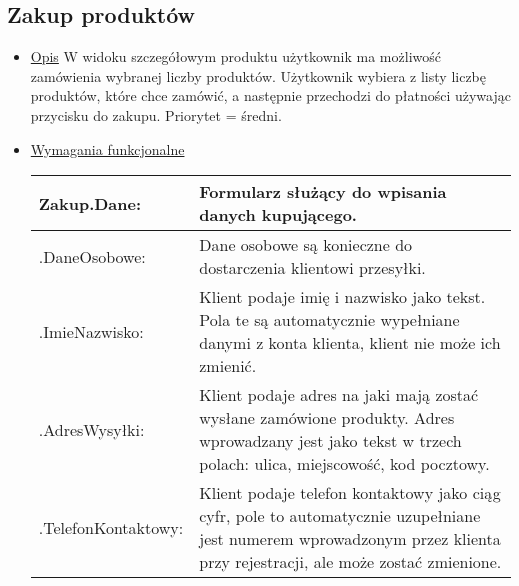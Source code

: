 \documentclass[a4paper,20pt]{article}
\begin{document}
\subsection{Zakup produktów}

\begin{itemize}
\item \underline{Opis} 
\newline
\newline
W widoku szczegółowym produktu użytkownik ma możliwość zamówienia wybranej liczby produktów. Użytkownik wybiera z listy liczbę produktów, które chce zamówić, a następnie przechodzi do płatności używając przycisku do zakupu. Priorytet = średni.
\newline

\item \underline{Wymagania funkcjonalne}

\begin{center}
\begin{tabularx}{\textwidth}[t]{XX}


\arrayrulecolor{black}\hline
\textbf{Zakup.Dane:} & \textbf{Formularz służący do wpisania danych kupującego.} \\

\hline

\quad .DaneOsobowe: & 
\begin{minipage}[t]{\linewidth}%
Dane osobowe są konieczne do dostarczenia klientowi przesyłki.    
\end{minipage}\\

\quad \quad .ImieNazwisko: & 
\begin{minipage}[t]{\linewidth}%
Klient podaje imię i nazwisko jako tekst. Pola te są automatycznie wypełniane danymi z konta klienta, klient nie może ich zmienić.    
\end{minipage}\\

\quad \quad .AdresWysyłki: & 
\begin{minipage}[t]{\linewidth}%
Klient podaje adres na jaki mają zostać wysłane zamówione produkty. Adres wprowadzany jest jako tekst w trzech polach: ulica, miejscowość, kod pocztowy. 
\end{minipage}\\

\quad \quad .TelefonKontaktowy: & 
\begin{minipage}[t]{\linewidth}%
Klient podaje telefon kontaktowy jako ciąg cyfr, pole to automatycznie uzupełniane jest numerem wprowadzonym przez klienta przy rejestracji, ale może zostać zmienione.     
\end{minipage}\\



\end{tabularx}
\end{center}
\end{itemize}
\end{document}
